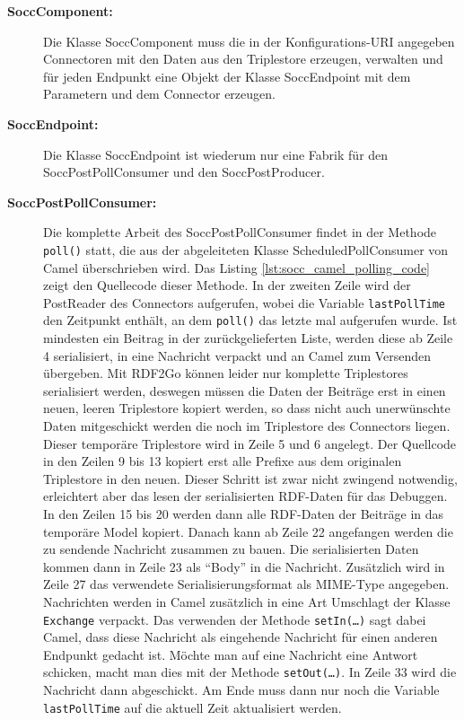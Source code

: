 \begin{description}
    \item[\textbf{SoccComponent:}] Die Klasse SoccComponent muss die in der Konfigurations-URI angegeben Connectoren mit den Daten aus den Triplestore erzeugen, verwalten und für jeden Endpunkt eine Objekt der Klasse SoccEndpoint mit dem Parametern und dem Connector erzeugen. 

    \item[\textbf{SoccEndpoint:}] Die Klasse SoccEndpoint ist wiederum nur eine Fabrik für den SoccPostPollConsumer und den SoccPostProducer. 

    \item[\textbf{SoccPostPollConsumer:}] Die komplette Arbeit des SoccPostPollConsumer findet in der Methode \texttt{poll()} statt, die aus der abgeleiteten Klasse ScheduledPollConsumer von Camel überschrieben wird. Das Listing \ref{lst:socc_camel_polling_code} zeigt den Quellecode dieser Methode. In der zweiten Zeile wird der PostReader des Connectors aufgerufen, wobei die Variable \texttt{lastPollTime} den Zeitpunkt enthält, an dem \texttt{poll()} das letzte mal aufgerufen wurde. Ist mindesten ein Beitrag in der zurückgelieferten Liste, werden diese ab Zeile 4 serialisiert, in eine Nachricht verpackt und an Camel zum Versenden übergeben. Mit RDF2Go können leider nur komplette Triplestores serialisiert werden, deswegen müssen die Daten der Beiträge erst in einen neuen, leeren Triplestore kopiert werden, so dass nicht auch unerwünschte Daten mitgeschickt werden die noch im Triplestore des Connectors liegen. Dieser temporäre Triplestore wird in Zeile 5 und 6 angelegt. Der Quellcode in den Zeilen 9 bis 13 kopiert erst alle Prefixe aus dem originalen Triplestore in den neuen. Dieser Schritt ist zwar nicht zwingend notwendig, erleichtert aber das lesen der serialisierten RDF-Daten für das Debuggen. In den Zeilen 15 bis 20 werden dann alle RDF-Daten der Beiträge in das temporäre Model kopiert. Danach kann ab Zeile 22 angefangen werden die zu sendende Nachricht zusammen zu bauen. Die serialisierten Daten kommen dann in Zeile 23 als \enquote{Body} in die Nachricht. Zusätzlich wird in Zeile 27 das verwendete Serialisierungsformat als MIME-Type angegeben. Nachrichten werden in Camel zusätzlich in eine Art Umschlagt der Klasse \texttt{Exchange} verpackt. Das verwenden der Methode \texttt{setIn(\dots)} sagt dabei Camel, dass diese Nachricht als eingehende Nachricht für einen anderen Endpunkt gedacht ist. Möchte man auf eine Nachricht eine Antwort schicken, macht man dies mit der Methode \texttt{setOut(\dots)}. In Zeile 33 wird die Nachricht dann abgeschickt. Am Ende muss dann nur noch die Variable \texttt{lastPollTime} auf die aktuell Zeit aktualisiert werden.
 

\end{description}
